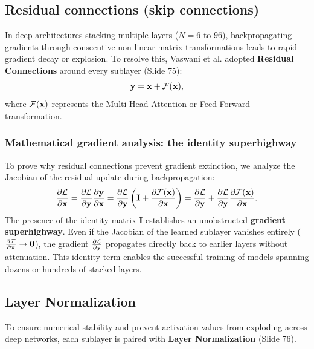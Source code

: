 \documentclass[../../../main.tex]{subfiles}
\begin{document}
\subsection{Residual connections (skip connections)}
\label{subsec:residual_connections_deep}

In deep architectures stacking multiple layers ($N = 6$ to $96$), backpropagating gradients through consecutive non-linear matrix transformations leads to rapid gradient decay or explosion. To resolve this, Vaswani et al. adopted \textbf{Residual Connections} \cite{he2016deep} around every sublayer (Slide 75):
\begin{equation}
\label{eq:residual_shortcut_op}
\mathbf{y} = \mathbf{x} + \mathcal{F}(\mathbf{x}),
\end{equation}
where $\mathcal{F}(\mathbf{x})$ represents the Multi-Head Attention or Feed-Forward transformation.

\subsubsection{Mathematical gradient analysis: the identity superhighway}
To prove why residual connections prevent gradient extinction, we analyze the Jacobian of the residual update during backpropagation:
\begin{equation}
\label{eq:residual_gradient_flow_ch5}
\frac{\partial \mathcal{L}}{\partial \mathbf{x}} = \frac{\partial \mathcal{L}}{\partial \mathbf{y}} \frac{\partial \mathbf{y}}{\partial \mathbf{x}} = \frac{\partial \mathcal{L}}{\partial \mathbf{y}} \left( \mathbf{I} + \frac{\partial \mathcal{F}(\mathbf{x})}{\partial \mathbf{x}} \right) = \frac{\partial \mathcal{L}}{\partial \mathbf{y}} + \frac{\partial \mathcal{L}}{\partial \mathbf{y}} \frac{\partial \mathcal{F}(\mathbf{x})}{\partial \mathbf{x}}.
\end{equation}
The presence of the identity matrix $\mathbf{I}$ establishes an unobstructed \textbf{gradient superhighway}. Even if the Jacobian of the learned sublayer vanishes entirely ($\frac{\partial \mathcal{F}}{\partial \mathbf{x}} \to \mathbf{0}$), the gradient $\frac{\partial \mathcal{L}}{\partial \mathbf{y}}$ propagates directly back to earlier layers without attenuation. This identity term enables the successful training of models spanning dozens or hundreds of stacked layers.

\subsection{Layer Normalization}
\label{subsec:layer_normalization_deep}

To ensure numerical stability and prevent activation values from exploding across deep networks, each sublayer is paired with \textbf{Layer Normalization} \cite{ba2016layer} (Slide 76).
\end{document}
